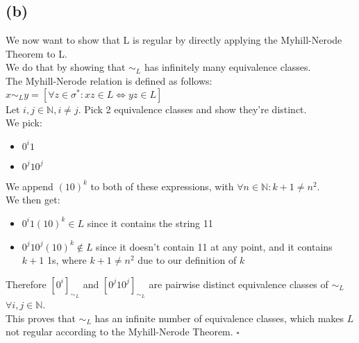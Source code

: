\subsection{(b)}
We now want to show that L is regular by directly applying the Myhill-Nerode Theorem to L.\\
We do that by showing that $\sim_{L}$ has infinitely many equivalence classes.\\
The Myhill-Nerode relation is defined as follows:\\
$x\sim_{L}y= [\forall z \in \sigma^{\ast}: xz \in L \Leftrightarrow yz \in L]$\\
Let $i,j \in \mathbb{N}, i \neq j$. Pick 2 equivalence classes and show they're distinct.\\
We pick:
\vspace{-5mm}
\begin{itemize}
    \item $0^{i}1$
    \item $0^{j}10^{j}$
\end{itemize}
We append $(10)^{k}$ to both of these expressions, with $\forall n \in \mathbb{N}: k+1 \neq n^{2}$.\\
We then get:
\vspace{-5mm}
\begin{itemize}
    \item $0^{i}1(10)^k \in L$ since it contains the string 11
    \item $0^{j}10^{j}(10)^k \notin L$ since it doesn't contain 11 at any point, and it contains $k+1$ 1s, where $k+1 \neq n^{2}$ due to our definition of $k$
\end{itemize}
Therefore $[0^{i}]_{\sim_{L}}$ and $[0^{j}10^{j}]_{\sim_{L}}$ are pairwise distinct equivalence classes of $\sim_{L}$ $\forall i,j \in \mathbb{N}$.\\
This proves that $\sim_{L}$ has an infinite number of equivalence classes, which makes $L$ not regular according to the Myhill-Nerode Theorem. $\square$



